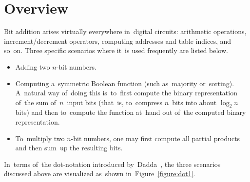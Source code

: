 \documentclass[sigconf, review, anonymous]{acmart}
\begin{document}
\maketitle

\section{Overview}
Bit addition arises virtually everywhere in~digital circuits:
arithmetic operations,
increment/decrement operators,
computing addresses and table indices, and so~on.
Three specific scenarios where it~is used frequently are listed below.
\begin{itemize}
	\item Adding two $n$-bit numbers.
	\item Computing a~symmetric Boolean function
		(such as~majority or~sorting).
		A~natural way of~doing this is~to~first compute
		the binary representation of~the sum of~$n$~input bits
		(that~is, to~compress $n$~bits into about $\log_2 n$ bits)
		and then to~compute the function at~hand
		out of~the computed binary representation.
	\item To~multiply two $n$-bit numbers, one may first compute
		all partial products and then sum~up the resulting bits.
\end{itemize}
In~terms of~the dot-notation introduced by~Dadda~\cite{dadda}, the three scenarios discussed above are visualized as~shown in~Figure~\ref{figure:dot1}.
\end{document}

